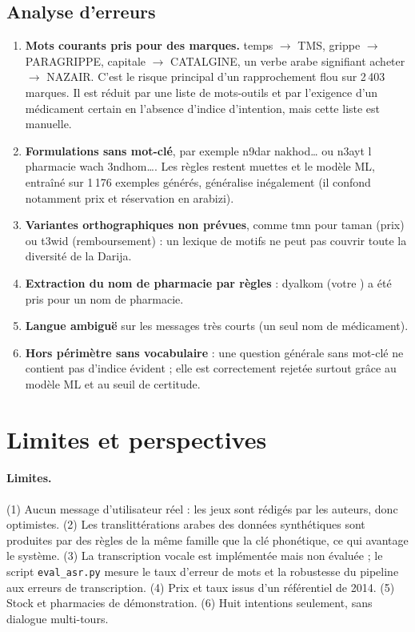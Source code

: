 \documentclass[11pt,a4paper]{article}
\begin{document}
\subsection{Analyse d'erreurs}
\begin{enumerate}[leftmargin=*]
\item \textbf{Mots courants pris pour des marques.} \og temps \fg{} $\rightarrow$ TMS, \og grippe \fg{} $\rightarrow$ PARAGRIPPE, \og capitale \fg{} $\rightarrow$ CATALGINE, un verbe arabe signifiant \og acheter \fg{} $\rightarrow$ NAZAIR. C'est le risque principal d'un rapprochement flou sur 2\,403 marques. Il est r\'eduit par une liste de mots-outils et par l'exigence d'un m\'edicament certain en l'absence d'indice d'intention, mais cette liste est manuelle.
\item \textbf{Formulations sans mot-cl\'e}, par exemple \og n9dar nakhod\ldots \fg{} ou \og n3ayt l pharmacie wach 3ndhom\ldots \fg. Les r\`egles restent muettes et le mod\`ele ML, entra\^in\'e sur 1\,176 exemples g\'en\'er\'es, g\'en\'eralise inégalement (il confond notamment prix et r\'eservation en arabizi).
\item \textbf{Variantes orthographiques non pr\'evues}, comme \og tmn \fg{} pour \og taman \fg{} (prix) ou \og t3wid \fg{} (remboursement) : un lexique de motifs ne peut pas couvrir toute la diversit\'e de la Darija.
\item \textbf{Extraction du nom de pharmacie par r\`egles} : \og dyalkom \fg{} (\og votre \fg) a \'et\'e pris pour un nom de pharmacie.
\item \textbf{Langue ambigu\"e} sur les messages tr\`es courts (un seul nom de m\'edicament).
\item \textbf{Hors p\'erim\`etre sans vocabulaire} : une question g\'en\'erale sans mot-cl\'e ne contient pas d'indice \'evident ; elle est correctement rejet\'ee surtout gr\^ace au mod\`ele ML et au seuil de certitude.
\end{enumerate}

\section{Limites et perspectives}
\paragraph{Limites.} (1) Aucun message d'utilisateur r\'eel : les jeux sont r\'edig\'es par les auteurs, donc optimistes. (2) Les translitt\'erations arabes des donn\'ees synth\'etiques sont produites par des r\`egles de la m\^eme famille que la cl\'e phon\'etique, ce qui avantage le syst\`eme. (3) La transcription vocale est impl\'ement\'ee mais non \'evalu\'ee ; le script \texttt{eval\_asr.py} mesure le taux d'erreur de mots et la robustesse du pipeline aux erreurs de transcription. (4) Prix et taux issus d'un r\'ef\'erentiel de 2014. (5) Stock et pharmacies de d\'emonstration. (6) Huit intentions seulement, sans dialogue multi-tours.
\end{document}
